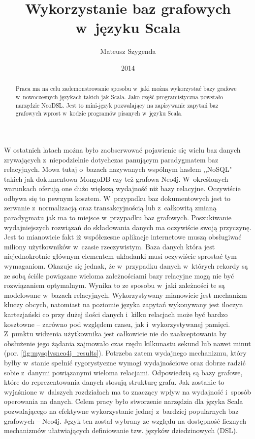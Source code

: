 \documentclass{xmgr}
\author   {Mateusz Szygenda}
\title    {Wykorzystanie baz grafowych w~języku Scala}
\date     {2014}
\begin{document}
\nocite{*}

\begin{abstract}
Praca ma na celu zademonstrowanie sposobu w~jaki można wykorzystać bazy grafowe w~nowoczesnych językach takich jak Scala. Jako część programistyczna powstało narzędzie NeoDSL. Jest to mini-język pozwalający na zapisywanie zapytań baz grafowych wprost w~kodzie programów pisanych w~języku Scala.
\end{abstract}

\maketitle

%
\introduction

W ostatnich latach można było zaobserwować pojawienie się wielu baz danych zrywających z~niepodzielnie dotychczas panującym paradygmatem baz relacyjnych. Mowa tutaj o~bazach nazywanych wspólnym hasłem ,,NoSQL" takich jak dokumentowa MongoDB czy też grafowa Neo4j. W~określonych warunkach oferują one dużo większą wydajność niż bazy relacyjne. Oczywiście odbywa się to pewnym kosztem. W~przypadku baz dokumentowych jest to zerwanie z~normalizacją oraz transakcyjnością lub z~całkowitą zmianą paradygmatu jak ma to miejsce w~przypadku baz grafowych. Poszukiwanie wydajniejszych rozwiązań do składowania danych ma oczywiście swoją przyczynę. Jest to mianowicie fakt iż współczesne aplikacje internetowe muszą obsługiwać miliony użytkowników w~czasie rzeczywistym. Baza danych która jest niejednokrotnie głównym elementem układanki musi oczywiście sprostać tym wymaganiom. Okazuje się jednak, że w~przypadku danych w~których rekordy są ze sobą ściśle powiązane wieloma zależnościami bazy relacyjne mogą nie być rozwiązaniem optymalnym. Wynika to ze sposobu w~jaki zależności te są modelowane w~bazach relacyjnych. Wykorzystywany mianowicie jest mechanizm kluczy obcych, natomiast na poziomie języka zapytań wykonywany jest iloczyn kartezjański co przy dużej ilości danych i~kilku relacjach może być bardzo kosztowne -- zarówno pod względem czasu, jak i~wykorzystywanej pamięci. Z~punktu widzenia użytkownika jest całkowicie nie do zaakceptowania by obsłużenie jego żądania zajmowało czas rzędu kilkunastu sekund lub nawet minut (por. \ref{fig:mysqlvsneo4j_results}). Potrzeba zatem wydajnego mechanizmu, który byłby w~stanie spełnić rygorystyczne wymogi wydajnościowe oraz dobrze radzić sobie z~danymi powiązanymi wieloma relacjami. Odpowiedzią są bazy grafowe, które do reprezentowania danych stosują strukturę grafu. Jak zostanie to wyjaśnione  w~dalszych rozdziałach ma to znaczący wpływ na wydajność i~sposób operowania na danych. Celem pracy było stworzenie narzędzia dla języka Scala pozwalającego na efektywne wykorzystanie jednej z~bardziej popularnych baz grafowych -- Neo4j. Język ten został wybrany ze względu na dostępność licznych mechanizmów ułatwiających definiowanie tzw. języków dziedzinowych (DSL).
\end{document}
